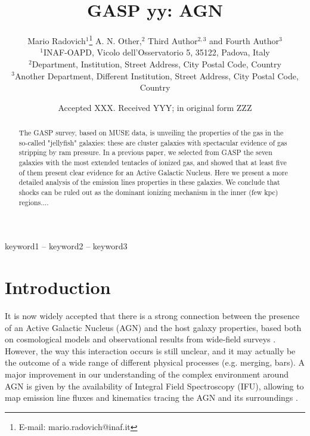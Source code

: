 \documentclass[fleqn,usenatbib]{mnras}
\title[GASP yy+: AGN]{GASP yy: AGN}
\author[M. Radovich et al.]{
Mario Radovich$^{1}$\thanks{E-mail: mario.radovich@inaf.it}
A. N. Other,$^{2}$
Third Author$^{2,3}$
and Fourth Author$^{3}$
\\
$^{1}$INAF-OAPD, Vicolo dell'Osservatorio 5, 35122, Padova, Italy\\
$^{2}$Department, Institution, Street Address, City Postal Code, Country\\
$^{3}$Another Department, Different Institution, Street Address, City Postal Code, Country
}
\date{Accepted XXX. Received YYY; in original form ZZZ}
\begin{document}
\label{firstpage}
\pagerange{\pageref{firstpage}--\pageref{lastpage}}
\maketitle

\begin{abstract}

The GASP survey, based on MUSE data, is unveiling the properties of the gas in the so-called "jellyfish" galaxies: these are cluster galaxies with spectacular evidence of gas stripping by ram pressure. In a previous paper, we selected from GASP the seven galaxies with the most extended 
tentacles of ionized gas, and showed that at least five of them present clear evidence for an Active Galactic Nucleus.
Here we present a more detailed analysis of the emission lines properties in these galaxies. We conclude that shocks can be ruled out as the dominant ionizing mechanism in the inner (few kpc) regions....

\end{abstract}

\begin{keywords}
keyword1 -- keyword2 -- keyword3
\end{keywords}





\section{Introduction}




It is now widely accepted that there is a strong connection between the presence of an Active Galactic Nucleus (AGN) and the host galaxy properties, based both on cosmological models and observational results from wide-field surveys 
\citep[see e.g.][and refs for a review]{2014ARA&A..52..589H}. However, the way this interaction occurs is still unclear, and it may actually be the outcome of a wide range of different physical processes (e.g. merging, bars).  A major improvement in our understanding of the complex environment around AGN is given by the availability of Integral Field Spectroscopy (IFU), allowing to map emission line fluxes and kinematics tracing the AGN and its surroundings \citep[see.g.][]{2018A&A...619A..74V, 2018arXiv181107935M}.
\end{document}
